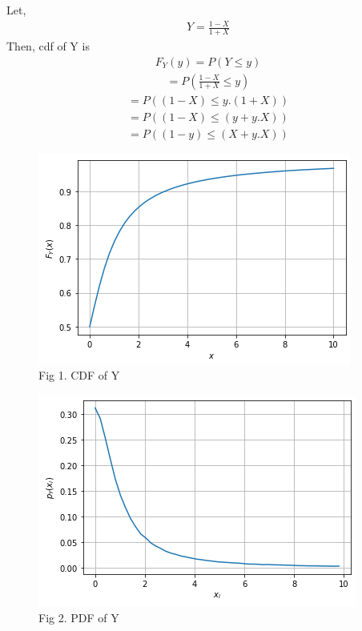 \documentclass[journal,12pt,twocolumn]{IEEEtran}
\begin{document}
Let,
\begin{align}
    Y = \frac{1-X}{1+X}
\end{align}
Then, cdf of Y is
\begin{align}
    F_{Y}(y) = P(Y \leq y)
\end{align}
\begin{align}
    = P\left(\frac{1-X}{1+X} \leq y\right)
\end{align}
\begin{align}
    = P\left((1-X) \leq y.(1+X)\right)
\end{align}
\begin{align}
    = P\left((1-X) \leq (y+y.X)\right)
\end{align}
\begin{align}
    = P\left((1-y) \leq (X+y.X)\right)
\end{align}
\begin{figure}[ht]
\centering
\includegraphics[width=\columnwidth]{cdf.png}
\caption*{Fig 1. CDF of Y}
\label{fig:fig1}
\end{figure}
\begin{figure}[ht]
\centering
\includegraphics[width=\columnwidth]{pdf.png}
\caption*{Fig 2. PDF of Y}
\label{fig:fig2}
\end{figure}
\end{document}
